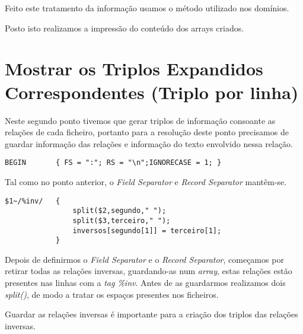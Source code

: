 \documentclass{report}
\def\titulo#1{\section{#1}}
\begin{document}
    Feito este tratamento da informação usamos o método utilizado nos domínios.

    Posto isto realizamos a impressão do conteúdo dos arrays criados.
 

\titulo{ Mostrar os Triplos Expandidos Correspondentes (Triplo por linha)}

    Neste segundo ponto tivemos que gerar triplos de informação consoante as relações de cada ficheiro, portanto para a resolução deste ponto precisamos de guardar informação das relações e informação do texto envolvido nessa relação.


\bigskip

\begin{verbatim}
BEGIN       { FS = ":"; RS = "\n";IGNORECASE = 1; }
\end{verbatim}
    
    Tal como no ponto anterior, o \textit{Field Separator} e \textit{Record Separator} mantêm-se. 

\begin{verbatim}
$1~/%inv/   {
                split($2,segundo," ");
                split($3,terceiro," ");
                inversos[segundo[1]] = terceiro[1]; 
            }
\end{verbatim}

    Depois de definirmos o \textit{Field Separator} e o \textit{Record Separator}, começamos por retirar todas as relações inversas, guardando-as num \textit{array}, estas relações estão presentes nas linhas com a \textit{tag \%inv}.
    Antes de as guardarmos realizamos dois \textit{split()}, de modo a tratar os espaços presentes nos ficheiros.

    Guardar as relações inversas é importante para a criação dos triplos das relações inversas.
\end{document}
